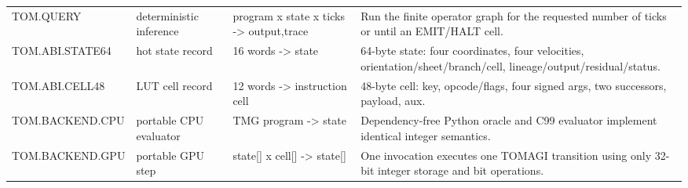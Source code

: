 \begin{longtable}{@{}L{0.18\textwidth}L{0.17\textwidth}L{0.20\textwidth}L{0.39\textwidth}@{}}
TOM.QUERY & deterministic inference & program x state x ticks -> output,trace & Run the finite operator graph for the requested number of ticks or until an EMIT/HALT cell. \\
TOM.ABI.STATE64 & hot state record & 16 words -> state & 64-byte state: four coordinates, four velocities, orientation/sheet/branch/cell, lineage/output/residual/status. \\
TOM.ABI.CELL48 & LUT cell record & 12 words -> instruction cell & 48-byte cell: key, opcode/flags, four signed args, two successors, payload, aux. \\
TOM.BACKEND.CPU & portable CPU evaluator & TMG program -> state & Dependency-free Python oracle and C99 evaluator implement identical integer semantics. \\
TOM.BACKEND.GPU & portable GPU step & state[] x cell[] -> state[] & One invocation executes one TOMAGI transition using only 32-bit integer storage and bit operations. \\
\end{longtable}
\normalsize

